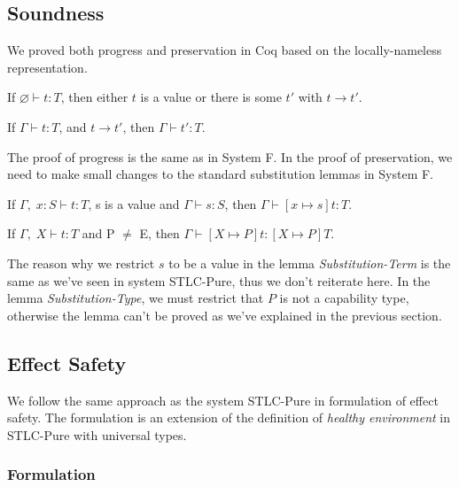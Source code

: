 \subsection{Soundness}

We proved both progress and preservation in Coq based on the
locally-nameless representation.

\begin{theorem}[Progress]
If $\varnothing \vdash t : T$, then either $t$ is a value or there is some
$t'$ with $t \longrightarrow t'$.
\end{theorem}

\begin{theorem}[Preservation]
If $\Gamma \vdash t : T$, and $t \longrightarrow t'$, then $\Gamma
\vdash t' : T$.
\end{theorem}

The proof of progress is the same as in System F. In the proof of
preservation, we need to make small changes to the standard
substitution lemmas in System F.

\begin{lemma}
  If $\Gamma,\; x:S \vdash t : T$, s is a value and
  $\Gamma \vdash s : S$, then $\Gamma \vdash [x \mapsto s]t : T$.
\end{lemma}

\begin{lemma}
  If $\Gamma,\; X \vdash t : T$ and P $\neq$ E,
  then $\Gamma \vdash [X \mapsto P]t : [X \mapsto P]T$.
\end{lemma}

The reason why we restrict $s$ to be a value in the lemma
\emph{Substitution-Term} is the same as we've seen in system
STLC-Pure, thus we don't reiterate here. In the lemma
\emph{Substitution-Type}, we must restrict that $P$ is not a
capability type, otherwise the lemma can't be proved as we've
explained in the previous section.

\subsection{Effect Safety}

We follow the same approach as the system STLC-Pure in formulation of
effect safety. The formulation is an extension of the definition of
\emph{healthy environment} in STLC-Pure with universal types.

\subsubsection{Formulation}

